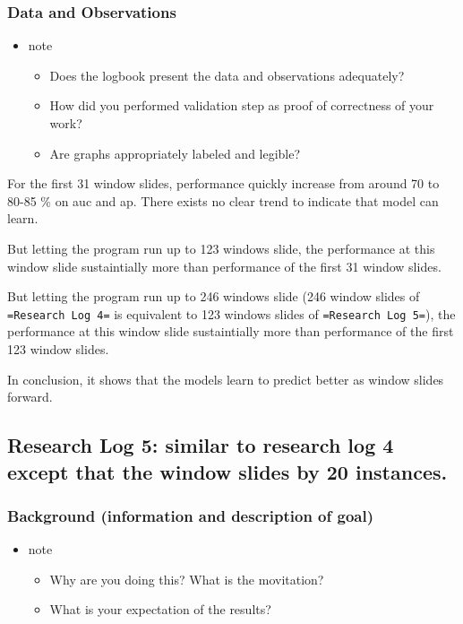 \documentclass[11pt]{article}
\begin{document}
\subsubsection{Data and Observations}
\label{sec:org5159e08}
\begin{itemize}
\item note
\begin{itemize}
\item Does the logbook present the data and observations adequately?
\item How did you performed validation step as proof of correctness of your work?
\item Are graphs appropriately labeled and legible?
\end{itemize}
\end{itemize}

For the first 31 window slides, performance quickly increase from around 70 to 80-85 \% on auc and ap.
There exists no clear trend to indicate that model can learn.

But letting the program run up to 123 windows slide, the performance at this window slide sustaintially more than performance of the first 31 window slides.

But letting the program run up to 246 windows slide (246 window slides of \texttt{=Research Log 4=} is equivalent to 123 windows slides of \texttt{=Research Log 5=}), the performance at this window slide sustaintially more than performance of the first 123 window slides.

In conclusion, it shows that the models learn to predict better as window slides forward.

\subsection{Research Log 5: similar to research log 4 except that the window slides by 20 instances.}
\label{sec:orgcd51349}
\subsubsection{Background (information and description of goal)}
\label{sec:orgb4fa9f6}
\begin{itemize}
\item note
\begin{itemize}
\item Why are you doing this? What is the movitation?
\item What is your expectation of the results?
\end{itemize}
\end{itemize}
\end{document}
